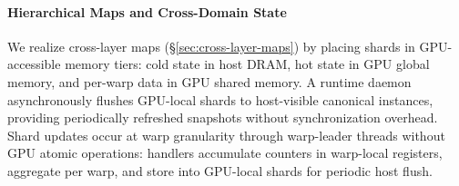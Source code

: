 \paragraph{Hierarchical Maps and Cross-Domain State}

We realize cross-layer maps (\S\ref{sec:cross-layer-maps}) by placing shards in GPU-accessible memory tiers: cold state in host DRAM, hot state in GPU global memory, and per-warp data in GPU shared memory.
A runtime daemon asynchronously flushes GPU-local shards to host-visible canonical instances, providing periodically refreshed snapshots without synchronization overhead.
Shard updates occur at warp granularity through warp-leader threads without GPU atomic operations: handlers accumulate counters in warp-local registers, aggregate per warp, and store into GPU-local shards for periodic host flush.
